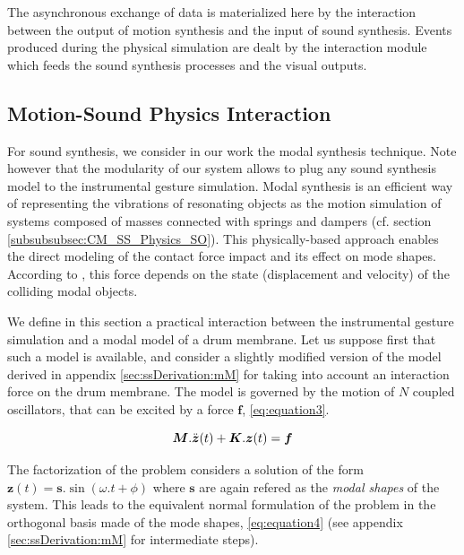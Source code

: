 The asynchronous exchange of data is materialized here by the interaction between the output of motion synthesis and the input of sound synthesis. Events produced during the physical simulation are dealt by the interaction module which feeds the sound synthesis processes and the visual outputs.


		\subsection{Motion-Sound Physics Interaction}
		\label{subsec:Synthesis_Control_InteractionMapping}

For sound synthesis, we consider in our work the modal synthesis technique. Note however that the modularity of our system allows to plug any sound synthesis model to the instrumental gesture simulation. Modal synthesis is an efficient way of representing the vibrations of resonating objects as the motion simulation of systems composed of masses connected with springs and dampers (cf. section \ref{subsubsubsec:CM_SS_Physics_SO}). This physically-based approach enables the direct modeling of the contact force impact and its effect on mode shapes. According to , this force depends on the state (displacement and velocity) of the colliding modal objects.

We define in this section a practical interaction between the instrumental gesture simulation and a modal model of a drum membrane. Let us suppose first that such a model is available, and consider a slightly modified version of the model derived in appendix \ref{sec:ssDerivation:mM} for taking into account an interaction force on the drum membrane.
The model is governed by the motion of $N$ coupled oscillators, that can be excited by a force $\boldsymbol{f}$, \myequname \eqref{eq:equation3}.

\begin{equation}
	\boldsymbol{M} . \ddot{\boldsymbol{z}}(t) + \boldsymbol{K} . \boldsymbol{z}(t) = \boldsymbol{f}
\label{eq:equation3}
\eqcaption{Modal synthesis formulation under the influence of an external force}
\end{equation}

The factorization of the problem considers a solution of the form $\boldsymbol{z}(t) = \boldsymbol{s} . \sin(\omega.t + \phi)$ where $\boldsymbol{s}$ are again refered as the \emph{modal shapes} of the system. This leads to the equivalent normal formulation of the problem in the orthogonal basis made of the mode shapes, \myequname \eqref{eq:equation4} (see appendix \ref{sec:ssDerivation:mM} for intermediate steps).

